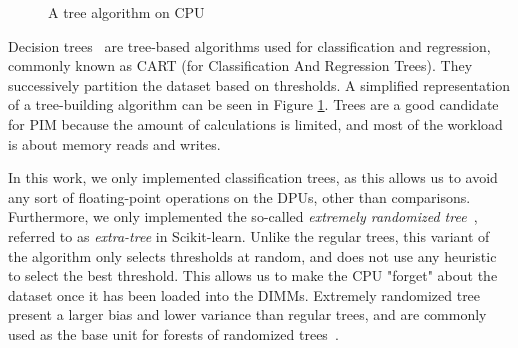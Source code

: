 \begin{figure}
    \centering
    \caption{\label{fig:TreeCPU}A tree algorithm on CPU}
\end{figure}


Decision trees~\cite{suthaharan2016decision} are tree-based algorithms used for classification and regression, commonly known as CART (for Classification And Regression Trees). They successively partition the dataset based on thresholds. A simplified representation of a tree-building algorithm can be seen in Figure \ref{fig:TreeCPU}. Trees are a good candidate for PIM because the amount of calculations is limited, and most of the workload is about memory reads and writes.

In this work, we only implemented classification trees, as this allows us to avoid any sort of floating-point operations on the DPUs, other than comparisons. Furthermore, we only implemented the so-called \emph{extremely randomized tree}~\cite{geurts2006extremely}, referred to as \emph{extra-tree} in Scikit-learn. Unlike the regular trees, this variant of the algorithm only selects thresholds at random, and does not use any heuristic to select the best threshold. This allows us to make the CPU "forget" about the dataset once it has been loaded into the DIMMs. Extremely randomized tree present a larger bias and lower variance than regular trees, and are commonly used as the base unit for forests of randomized trees~\cite{breiman2001random}.

